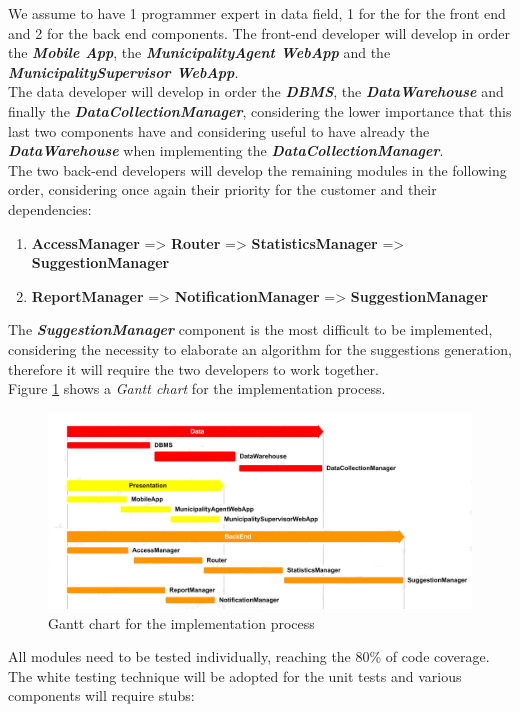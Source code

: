 \documentclass[a4paper]{report}
\begin{document}
We assume to have 1 programmer expert in data field, 1 for the for the front end and 2 for the back end components.
The front-end developer will develop in order the \textbf{\textit{Mobile App}}, the \textbf{\textit{MunicipalityAgent WebApp}} and the \textbf{\textit{MunicipalitySupervisor WebApp}}.\\
The data developer will develop in order the \textbf{\textit{DBMS}}, the \textbf{\textit{DataWarehouse}} and finally the \textbf{\textit{DataCollectionManager}}, considering the lower importance that this last two components have and considering useful to have already the \textbf{\textit{DataWarehouse}} when implementing the \textit{\textbf{DataCollectionManager}}.\\
The two back-end developers will develop the remaining modules in the following order, considering once again their priority for the customer and their dependencies:
\begin{enumerate}[label=\arabic*)]
\item \textbf{AccessManager} => \textbf{Router} => \textbf{StatisticsManager} => \textbf{SuggestionManager}
\item \textbf{ReportManager} => \textbf{NotificationManager}  => \textbf{SuggestionManager}
\end{enumerate}
The \textbf{\textit{SuggestionManager}} component is the most difficult to be implemented, considering the necessity to elaborate an algorithm for the suggestions generation, therefore it will require the two developers to work together.\\
Figure \ref{fig:gantt} shows a \textit{Gantt chart} for the implementation process.\\
\begin{figure}[htp]
\includegraphics[width=\textwidth]{Gantt2}
\caption{Gantt chart for the implementation process}
\label{fig:gantt}
\end{figure}
All modules need to be tested individually, reaching the 80\% of code coverage. The white testing technique will be adopted for the unit tests and various components will require stubs:
\end{document}
